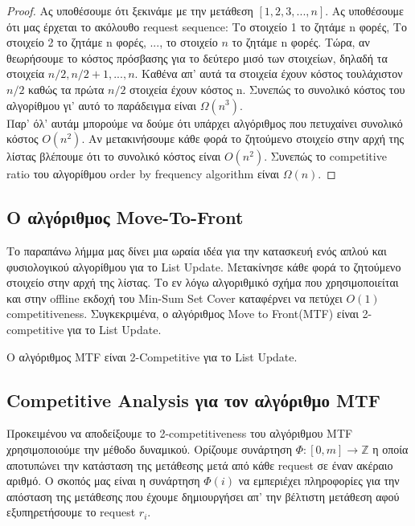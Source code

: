 \begin{proof}
    Ας υποθέσουμε ότι ξεκινάμε με την μετάθεση $[ 1,2,3,...,n ]$. Ας υποθέσουμε ότι μας έρχεται το ακόλουθο request sequence: Το στοιχείο 1 το ζητάμε n φορές, Το στοιχείο 2 το ζητάμε n φορές, ..., το στοιχείο $n$ το ζητάμε n φορές. Τώρα, αν θεωρήσουμε το κόστος πρόσβασης για το δεύτερο μισό των στοιχείων, δηλαδή τα στοιχεία $n/2, n/2 + 1, ..., n$. Καθένα απ' αυτά τα στοιχεία έχουν κόστος τουλάχιστον $n/2$ καθώς τα πρώτα $n/2$ στοιχεία έχουν κόστος n. Συνεπώς το συνολικό κόστος του αλγορίθμου γι' αυτό το παράδειγμα είναι $\Omega(n^3)$. \\
    
    Παρ' όλ' αυτάμ μπορούμε να δούμε ότι υπάρχει αλγόριθμος που πετυχαίνει συνολικό κόστος $O(n^2)$. Αν μετακινήσουμε κάθε φορά το ζητούμενο στοιχείο στην αρχή της λίστας βλέπουμε ότι το συνολικό κόστος είναι $O(n^2)$. Συνεπώς το competitive ratio του αλγορίθμου order by frequency algorithm είναι $\Omega(n)$.
\end{proof}

\subsection{Ο αλγόριθμος Move-To-Front}

Το παραπάνω λήμμα μας δίνει μια ωραία ιδέα για την κατασκευή ενός απλού και φυσιολογικού αλγορίθμου για το List Update. Μετακίνησε κάθε φορά το ζητούμενο στοιχείο στην αρχή της λίστας. Το εν λόγω αλγοριθμικό σχήμα που χρησιμοποιείται και στην offline εκδοχή του Min-Sum Set Cover καταφέρνει να πετύχει $O(1)$ competitiveness. Συγκεκριμένα, ο αλγόριθμος Move to Front(MTF) είναι 2-competitive για το List Update.

\begin{lemma}\label{l:mtf_competitive}
    Ο αλγόριθμος MTF είναι 2-Competitive για το List Update.
\end{lemma}

\subsection{Competitive Analysis για τον αλγόριθμο MTF}

Προκειμένου να αποδείξουμε το 2-competitiveness του αλγόριθμου MTF χρησιμοποιούμε την μέθοδο δυναμικού. Ορίζουμε συνάρτηση $\Phi: [0, m] \rightarrow \mathbb{Z}$ η οποία αποτυπώνει την κατάσταση της μετάθεσης μετά από κάθε request σε έναν ακέραιο αριθμό. Ο σκοπός μας είναι η συνάρτηση $\Phi( i )$ να εμπεριέχει πληροφορίες για την απόσταση της μετάθεσης που έχουμε δημιουργήσει απ' την βέλτιστη μετάθεση αφού εξυπηρετήσουμε το request $r_i$. \\

